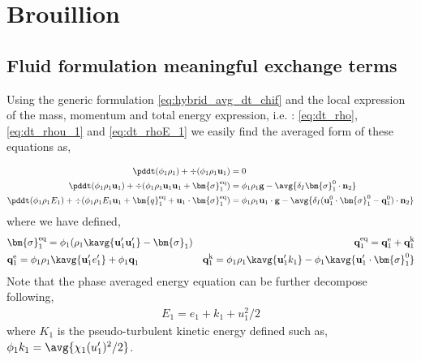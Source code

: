 \section{Brouillion}
\subsection*{Fluid formulation meaningful exchange terms}


Using the generic formulation \ref{eq:hybrid_avg_dt_chif} and the local expression of the mass, momentum and total energy expression, i.e. : \ref{eq:dt_rho},\ref{eq:dt_rhou_1} and \ref{eq:dt_rhoE_1} we easily find the averaged form of these equations as, 

\begin{align}
    \pddt (\phi_1 \rho_1)  
    + \div (
        \phi_1 \rho_1\textbf{u}_1
    )
    &= 
    0\\
    \pddt (\phi_1 \rho_1\textbf{u}_1)  
    + \div (
        \phi_1 \rho_1\textbf{u}_1\textbf{u}_1
        + \bm{\sigma}_1^\text{eq}
    )
    &= 
    \phi_1 \rho_1 \textbf{g} 
    -  \avg{\delta_I \bm{\sigma}_1^0 \cdot \textbf{n}_2}\\
    \pddt (\phi_1\rho_1E_1)  
    + \div (
        \phi_1\rho_1E_1\textbf{u}_1
        + \bm{q}_1^\text{eq}
        + \textbf{u}_1 \cdot \bm{\sigma}_1^\text{eq}
        )
    &= 
    \phi_1 \rho_1\textbf{u}_1 \cdot \textbf{g} 
    - \avg{\delta_I (\textbf{u}_1^0 \cdot \bm{\sigma}_1^0 - \textbf{q}_1^0)\cdot \textbf{n}_2}
\end{align} 
where we have defined, 
\begin{align*}
    &\bm{\sigma}_1^\text{eq}
    = \phi_1 (
        \rho_1\kavg{\textbf{u}_1'\textbf{u}_1'}
        - \bm{\sigma}_1%
         )  
    &\textbf{q}_1^\text{eq}
    =\textbf{q}_1^\text{e} +\textbf{q}_1^\text{k}  \\
    &\textbf{q}_1^\text{e}
    = \phi_1\rho_1 \kavg{\textbf{u}_1' e_1'} 
    + \phi_1\textbf{q}_1 
    &\textbf{q}_1^\text{k}
    = \phi_1\rho_1 \kavg{\textbf{u}_1' k_1} 
    - \phi_1\kavg{\textbf{u}_1' \cdot \bm{\sigma}_1^0}
\end{align*}
Note that the phase averaged energy equation can be further decompose following, 
\begin{align*}
    E_1 = e_1 + k_1 + u_1^2/2
    \label{eq:E_def}
\end{align*}
where $K_1$ is the pseudo-turbulent kinetic energy defined such as, $\phi_1 k_1 = \avg{\chi_1 (u_1')^2/2}$. 
